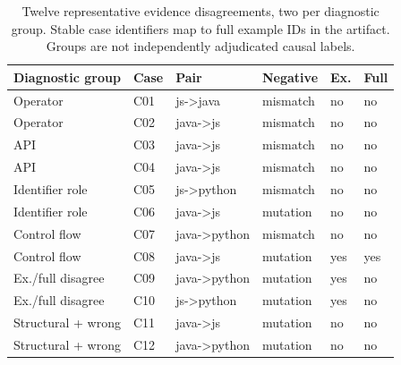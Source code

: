 \begin{table}[t]
\centering
\footnotesize
\caption{Twelve representative evidence disagreements, two per diagnostic group. Stable case identifiers map to full example IDs in the artifact. Groups are not independently adjudicated causal labels.}
\label{tab:qualitative-cases-12}
\begin{tabular}{llllll}
\toprule
Diagnostic group & Case & Pair & Negative & Ex. & Full \\
\midrule
Operator & C01 & js->java & mismatch & no & no \\
Operator & C02 & java->js & mismatch & no & no \\
API & C03 & java->js & mismatch & no & no \\
API & C04 & java->js & mismatch & no & no \\
Identifier role & C05 & js->python & mismatch & no & no \\
Identifier role & C06 & java->js & mutation & no & no \\
Control flow & C07 & java->python & mismatch & no & no \\
Control flow & C08 & java->js & mutation & yes & yes \\
Ex./full disagree & C09 & java->python & mutation & yes & no \\
Ex./full disagree & C10 & js->python & mutation & yes & no \\
Structural + wrong & C11 & java->js & mutation & no & no \\
Structural + wrong & C12 & java->python & mutation & no & no \\
\bottomrule
\end{tabular}
\end{table}
